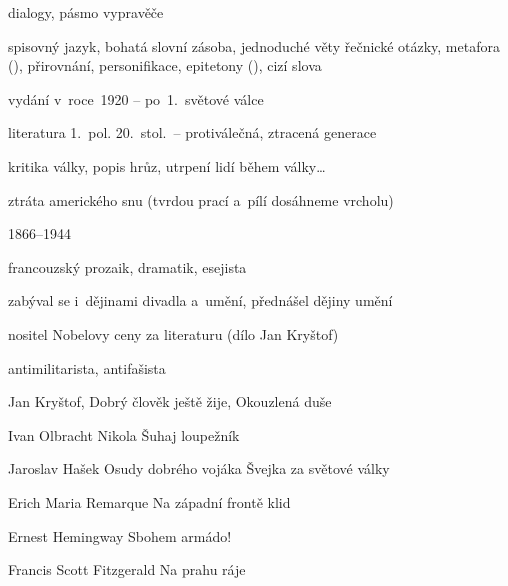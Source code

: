 { %
dialogy, pásmo vypravěče

\newpart

spisovný jazyk, bohatá slovní zásoba, jednoduché věty
řečnické otázky, metafora (),
přirovnání, personifikace, epitetony (), cizí slova

\begin{compactitem}
	\item vydání v~roce~1920 -- po~1.~světové válce
	\item literatura 1.~pol. 20.~stol.~-- protiválečná, ztracená generace
	\item kritika války, popis hrůz, utrpení lidí během války\dots
	\item ztráta amerického snu (tvrdou prací a~pílí dosáhneme vrcholu)
\end{compactitem}

\parag{\getauthor}
\begin{compactitem}
	\item 1866--1944
	\item francouzský prozaik, dramatik, esejista
	\item zabýval se i~dějinami divadla a~umění, přednášel dějiny umění
	\item nositel Nobelovy ceny za literaturu (dílo Jan Kryštof)
	\item antimilitarista, antifašista
	\item Jan Kryštof, Dobrý člověk ještě žije, Okouzlená duše
\end{compactitem}

\begin{compactdesc}
	\item[Ivan Olbracht] Nikola Šuhaj loupežník
	\item[Jaroslav Hašek] Osudy dobrého vojáka Švejka za světové války
	\item[Erich Maria Remarque] Na západní frontě klid
	\item[Ernest Hemingway] Sbohem armádo!
	\item[Francis Scott Fitzgerald] Na prahu ráje
\end{compactdesc}
}
